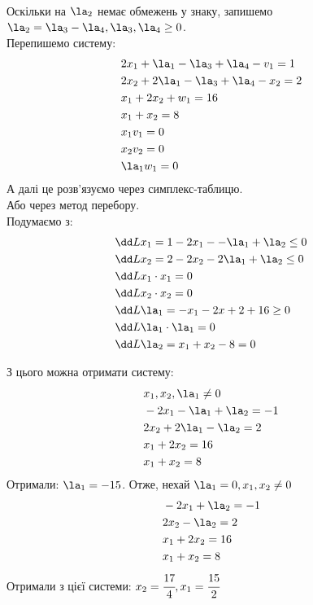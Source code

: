 \begin{tsk}
\begin{eqnarray}
\end{eqnarray}
Оскільки на $\la_2$ немає обмежень у знаку, запишемо $\la_2 = \la_3 - \la_4,\la_3,\la_4\geq0$.\\
Перепишемо систему:\\
\begin{eqnarray}
&2x_1 +\la_1 - \la_3+\la_4 -v_1 = 1\\
&2x_2 + 2\la_1 - \la_3 + \la_4 -x_2 = 2\\
&x_1 + 2x_2 +w_1 = 16\\
&x_1 + x_2 =8\\
&x_1v_1 =0\\
&x_2 v_2 =0 \\
&\la_1w_1 =0\\
\end{eqnarray}
А далі це розв’язуємо через симплекс-таблицю.\\
Або через метод перебору.\\
Подумаємо з:
\begin{eqnarray}
&\dd L{x_1} = 1 - 2 x_1- - \la_1 + \la_2 \leq 0 \\
&\dd L{x_2} = 2 - 2x_2 -2\la_1 +\la_2 \leq 0\\
&\dd L{x_1}\cdot x_1 = 0\\
&\dd L{x_2} \cdot x_2 = 0\\
&\dd L{\la_1} = -x_1 - 2x+2 +16 \geq 0 \\
&\dd L{\la_1} \cdot \la_1 = 0 \\
&\dd L{\la_2} = x_1 +x_2 - 8 = 0
\end{eqnarray}

З цього можна отримати систему:
\begin{eqnarray}
&x_1,x_2,\la_1\neq 0\\
&-2x_1 -\la_1+\la_2 = -1 \\
&2x_2 + 2\la_1 -\la_2 = 2\\
&x_1+2x_2 = 16\\
&x_1+x_2 = 8
\end{eqnarray}
Отримали: $\la_1=-15$. Отже, нехай $\la_1 =0,x_1,x_2\neq 0$
\begin{eqnarray}
&-2x_1+\la_2 = -1 \\
&2x_2 -\la_2 = 2\\
&x_1+2x_2 = 16\\
&x_1+x_2 = 8
\end{eqnarray}
Отримали з цієї системи: $x_2 = \cfrac{17}4,x_1 = \cfrac{15}{2}$

\end{tsk}